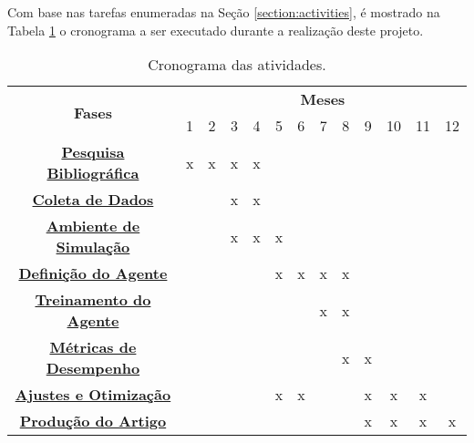 
Com base nas tarefas enumeradas na Seção \ref{section:activities}, é mostrado na Tabela \ref{tab:chronogram} o cronograma a ser executado durante a realização deste projeto.

\begin{table}[ht]
\centering
\caption{Cronograma das atividades.}
\begin{tabular}{|c|c|c|c|c|c|c|c|c|c|c|c|c|}
\hline
\multirow{2}{*}{{\bf Fases}} & \multicolumn{12}{c|}{{\bf Meses}}
\\ \cline{2-13}
    & 1 & 2 & 3 & 4 & 5 & 6 & 7 & 8 & 9 & 10 & 11 & 12
\\ \hline
    {\bf \hyperref[item:bibliography_review]{Pesquisa Bibliográfica} } 
    & x & x & x & x & & & & & & & &
\\ \hline
    {\bf \hyperref[item:data]{Coleta de Dados}} 
    &  &  & x & x & & & & & & & &
\\ \hline
    {\bf \hyperref[item:environment]{Ambiente de Simulação}} 
    &  &  & x & x & x &  &  & & & & &
\\ \hline
    {\bf \hyperref[item:agent]{Definição do Agente}} 
    &  &  &  &  & x & x & x & x &  &  &  & 
\\ \hline
    {\bf \hyperref[item:training]{Treinamento do Agente}} 
    & & & & & & & x & x & & & & 
\\ \hline
    {\bf \hyperref[item:evaluation]{Métricas de Desempenho}} 
    &  &  &  &  &  &  &  & x & x & & & 
\\ \hline    
    {\bf \hyperref[item:adjustments]{Ajustes e Otimização}} 
    & & & & & x & x & & & x & x & x &
\\ \hline
    {\bf \hyperref[item:reports]{Produção do Artigo}} 
    & & & & & & & & & x & x & x & x
\\ \hline
\end{tabular}
\label{tab:chronogram}
\end{table}
